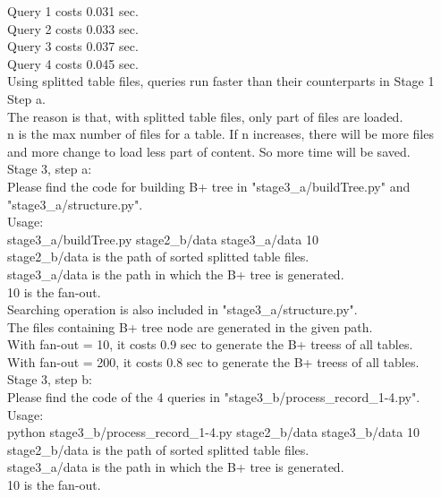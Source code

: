 \documentclass[a4paper]{article}
\begin{document}
Query 1 costs 0.031 sec.\\
Query 2 costs 0.033 sec.\\
Query 3 costs 0.037 sec.\\
Query 4 costs 0.045 sec.\\
Using splitted table files, queries run faster than their counterparts in Stage 1 Step a.\\
The reason is that, with splitted table files, only part of files are loaded. \\
n is the max number of files for a table. If n increases, there will be more files and more change to load less part of content. 
So more time will be saved.\\


Stage 3, step a:\\
Please find the code for building B+ tree in "stage3\_a/buildTree.py" and "stage3\_a/structure.py".\\
Usage: \\
stage3\_a/buildTree.py stage2\_b/data stage3\_a/data 10\\
stage2\_b/data is the path of sorted splitted table files.\\
stage3\_a/data is the path in which the B+ tree is generated.\\
10 is the fan-out.\\

Searching operation is also included in "stage3\_a/structure.py".\\
The files containing B+ tree node are generated in the given path.\\
With fan-out = 10, it costs 0.9 sec to generate the B+ treess of all tables.\\
With fan-out = 200, it costs 0.8 sec to generate the B+ treess of all tables.\\

Stage 3, step b:\\
Please find the code of the 4 queries in "stage3\_b/process\_record\_1-4.py".\\
Usage:\\
python stage3\_b/process\_record\_1-4.py stage2\_b/data stage3\_b/data 10
stage2\_b/data is the path of sorted splitted table files.\\
stage3\_a/data is the path in which the B+ tree is generated.\\
10 is the fan-out.\\
\end{document}
